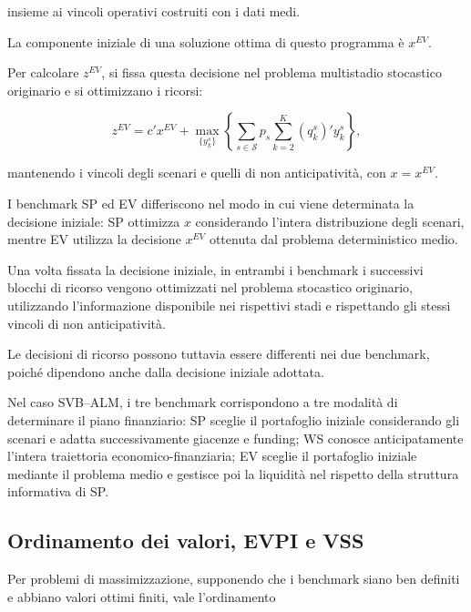 \noindent insieme ai vincoli operativi costruiti
con i dati medi.

La componente iniziale di una soluzione
ottima di questo programma \`e $x^{EV}$.

Per calcolare $z^{EV}$, si fissa
questa decisione nel problema
multistadio stocastico originario
e si ottimizzano i ricorsi:

\[
z^{EV}
=
c'x^{EV}
+
\max_{\{y_k^s\}}
\left\{
\sum_{s\in\mathcal S}p_s
\sum_{k=2}^{K}(q_k^s)'y_k^s
\right\},
\]

\noindent mantenendo i vincoli degli scenari
e quelli di non anticipativit\`a,
con $x=x^{EV}$.


I benchmark SP ed EV differiscono
nel modo in cui viene determinata
la decisione iniziale: SP ottimizza
$x$ considerando l'intera distribuzione
degli scenari, mentre EV utilizza
la decisione $x^{EV}$ ottenuta
dal problema deterministico medio.

Una volta fissata la decisione iniziale,
in entrambi i benchmark i successivi
blocchi di ricorso vengono ottimizzati
nel problema stocastico originario,
utilizzando l'informazione disponibile
nei rispettivi stadi e rispettando
gli stessi vincoli di non anticipativit\`{a}.

Le decisioni di ricorso possono tuttavia
essere differenti nei due benchmark,
poich\'{e} dipendono anche dalla
decisione iniziale adottata.



\medskip

Nel caso SVB--ALM, i tre benchmark
corrispondono a tre modalit\`a
di determinare il piano finanziario:
SP sceglie il portafoglio iniziale
considerando gli scenari e adatta
successivamente giacenze e funding;
WS conosce anticipatamente
l'intera traiettoria economico-finanziaria;
EV sceglie il portafoglio iniziale
mediante il problema medio e gestisce
poi la liquidit\`a nel rispetto
della struttura informativa di SP.

\subsection{Ordinamento dei valori, EVPI e VSS}

Per problemi di massimizzazione,
supponendo che i benchmark siano
ben definiti e abbiano valori ottimi finiti,
vale l'ordinamento

